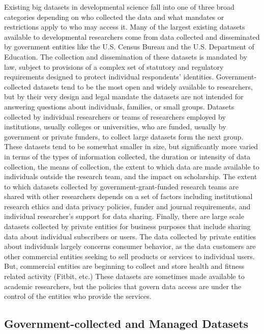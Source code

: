 \documentclass[letterpaper,man,apacite]{apa6}
\begin{document}
Existing big datasets in developmental science fall into one of three broad categories depending on who collected the data and what mandates or restrictions apply to who may access it.
Many of the largest existing datasets available to developmental researchers come from data collected and disseminated by government entities like the U.S. Census Bureau and the U.S. Department of Education.
The collection and dissemination of these datasets is mandated by law, subject to provisions of a complex set of statutory and regulatory requirements designed to protect individual respondents' identities.
Government-collected datasets tend to be the most open and widely available to researchers, but by their very design and legal mandate the datasets are not intended for answering questions about individuals, families, or small groups.
Datasets collected by individual researchers or teams of researchers employed by institutions, usually colleges or universities, who are funded, usually by government or private funders, to collect large datasets form the next group.
These datasets tend to be somewhat smaller in size, but significantly more varied in terms of the types of information collected, the duration or intensity of data collection, the means of collection, the extent to which data are made available to individuals outside the research team, and the impact on scholarship.
The extent to which datasets collected by government-grant-funded research teams are shared with other researchers depends on a set of factors including institutional research ethics and data privacy policies, funder and journal requirements, and individual researcher's support for data sharing.
Finally, there are large scale datasets collected by private entities for business purposes that include sharing data about individual subscribers or users.
The data collected by private entities about individuals largely concerns consumer behavior, as the data customers are other commercial entities seeking to sell products or services to individual users.
But, commercial entities are beginning to collect and store health and fitness related activity (Fitbit, etc.) 
These datasets are sometimes made available to academic researchers, but the policies that govern data access are under the control of the entities who provide the services.

\subsection{Government-collected and Managed Datasets}
\end{document}
